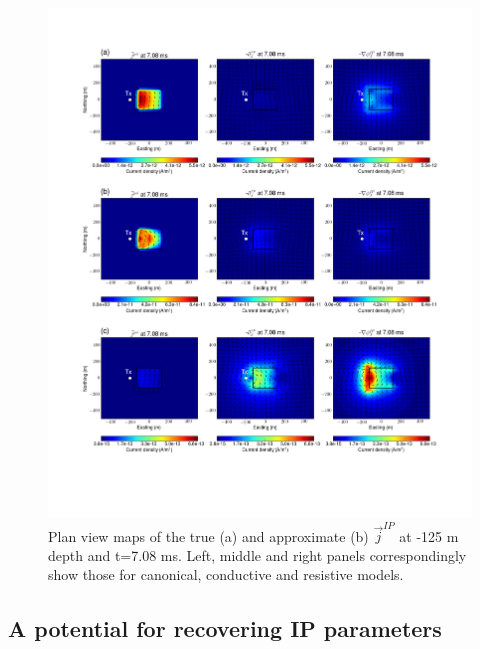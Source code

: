 \documentclass[a4paper, 11pt]{article}
\renewcommand {\j}  { {\vec j} }
\begin{document}
\begin{figure}[htb]
  \centering  \includegraphics[width=1.0\textwidth]{figures/threecasesresp/jpolvsj1IP_ch38.png}
  \caption{Plan view maps of the true (a) and approximate (b) $\j^{IP}$ at -125 m depth and t=7.08 ms. Left, middle and right panels correspondingly show those for canonical, conductive and resistive models.}
  \label{F:jpolvsj1IP}
\end{figure}
\clearpage
\subsection{A potential for recovering IP parameters}
\end{document}
